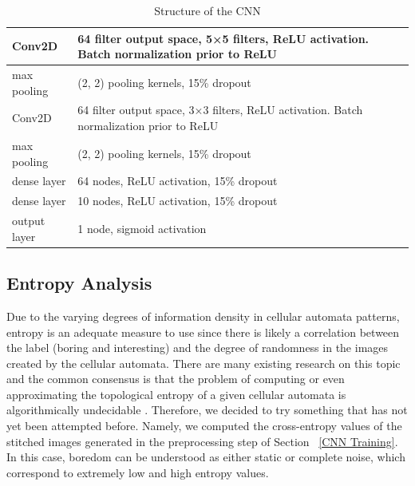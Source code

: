 \documentclass[12pt]{article}
\numberwithin{figure}{section} %
\begin{document}
\begin{table}[H]
	\begin{center}
		\begin{tabular}{ | m{2cm} | m{8cm} | } 
			\hline
			Conv2D & 64 filter output space, 5×5 filters, ReLU activation. Batch normalization prior to ReLU \\ 
			\hline
			max pooling & (2, 2) pooling kernels, 15\% dropout  \\ 
			\hline
			Conv2D & 64 filter output space, 3×3 filters, ReLU activation. Batch normalization prior to ReLU  \\ 
			\hline
			max pooling & (2, 2) pooling kernels, 15\% dropout \\ 
			\hline
			dense layer & 64 nodes, ReLU activation, 15\% dropout  \\ 
			\hline
			dense layer & 10 nodes, ReLU activation, 15\% dropout  \\ 
			\hline
			output layer & 1 node, sigmoid activation \\
			\hline
		\end{tabular}
	\caption{Structure of the CNN}
	\label{table:CNN structure}
	\vspace{-1.5em}
	\end{center}
\end{table}

\subsection{Entropy Analysis}
Due to the varying degrees of information density in cellular automata patterns, entropy is an adequate measure to use since there is likely a correlation between the label (boring and interesting) and the degree of randomness in the images created by the cellular automata. There are many existing research on this topic and the common consensus is that the problem of computing or even approximating the topological entropy of a given cellular automata is algorithmically undecidable \cite{entropy, entropy-two}. Therefore, we decided to try something that has not yet been attempted before. Namely, we computed the cross-entropy values of the stitched images generated in the preprocessing step of Section ~\ref{CNN Training}. In this case, boredom can be understood as either static or complete noise, which correspond to extremely low and high entropy values. 
\end{document}

